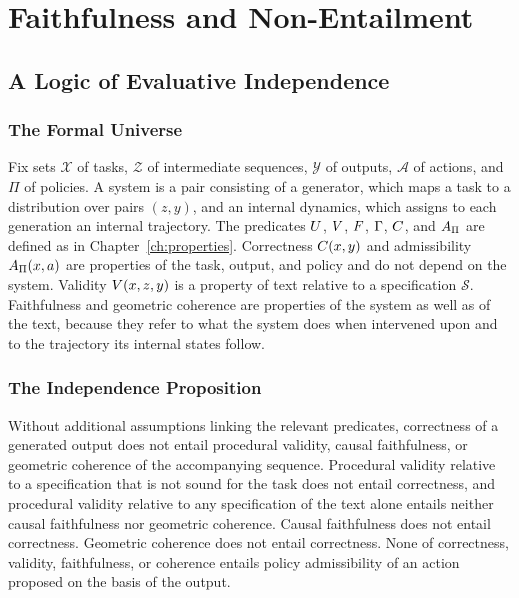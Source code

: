 \part{Faithfulness and Non-Entailment}
\label{part:faithfulness}

\chapter{A Logic of Evaluative Independence}
\label{ch:independence}

\section{The Formal Universe}

Fix sets $\mathcal X$ of tasks, $\mathcal Z$ of intermediate sequences, $\mathcal Y$ of outputs, $\mathcal A$ of actions, and $\Pi$ of policies. A system is a pair consisting of a generator, which maps a task to a distribution over pairs $(z,y)$, and an internal dynamics, which assigns to each generation an internal trajectory. The predicates $U$, $V$, $F$, $\Gamma$, $C$, and $A_\Pi$ are defined as in Chapter~\ref{ch:properties}. Correctness $C(x,y)$ and admissibility $A_\Pi(x,a)$ are properties of the task, output, and policy and do not depend on the system. Validity $V(x,z,y)$ is a property of text relative to a specification $\mathcal S$. Faithfulness and geometric coherence are properties of the system as well as of the text, because they refer to what the system does when intervened upon and to the trajectory its internal states follow.

\section{The Independence Proposition}

\begin{proposition}\label{prop:independence}
Without additional assumptions linking the relevant predicates, correctness of a generated output does not entail procedural validity, causal faithfulness, or geometric coherence of the accompanying sequence. Procedural validity relative to a specification that is not sound for the task does not entail correctness, and procedural validity relative to any specification of the text alone entails neither causal faithfulness nor geometric coherence. Causal faithfulness does not entail correctness. Geometric coherence does not entail correctness. None of correctness, validity, faithfulness, or coherence entails policy admissibility of an action proposed on the basis of the output.
\end{proposition}

